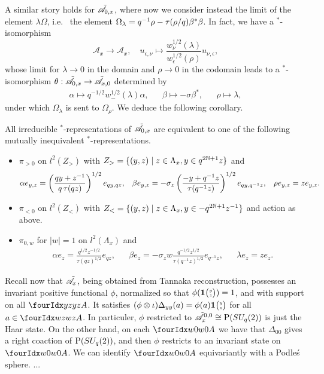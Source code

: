 A similar story holds for $\tilde{\mathscr{A}}_{0,x}$, where now we consider instead the limit of the element $\lambda \Omega$, i.e.~ the element $\Omega_{\lambda} = q^{-1}\rho - \operatorname{\tau}(\rho/q)\beta^*\beta$. In fact, we have a $^*$-isomorphism \[\mathscr{A}_x\rightarrow \mathscr{A}_x, \quad u_{\epsilon,\nu}\mapsto \frac{w_{\nu}^{1/2}(\lambda)}{w_{\epsilon}^{1/2}(\rho)}u_{\nu,\epsilon},\] whose limit for $\lambda\rightarrow 0$ in the domain and $\rho\rightarrow 0$ in the codomain leads to a $^*$-isomorphism $\theta: \tilde{\mathscr{A}}_{0,x}\rightarrow \tilde{\mathscr{A}}_{x,0}$ determined by  \begin{align*} \alpha \mapsto q^{-1/2}w_{-}^{1/2}(\lambda) \alpha,&& \beta \mapsto -\sigma\beta^*,&& \rho \mapsto \lambda,\end{align*} under which $\Omega_{\lambda}$ is sent to $\Omega_{\rho}$. We deduce the following corollary. 

\begin{Cor} All irreducible $^*$-representations of $\tilde{\mathscr{A}}_{0,x}$ are equivalent to one of the following mutually inequivalent $^*$-representations.
\begin{itemize} 
\item $\pi_{>0}$ on $l^2(Z_>)$ with $Z_> = \{(y,z)\mid z\in \Lambda_x,y\in q^{2\mathbb{N}+1}z\}$ and  \begin{align*} \alpha e_{y,z} =  \left(\frac{qy+z^{-1}}{q\operatorname{\tau}(qz)}\right)^{1/2}e_{qy,qz}, && \beta e_{y,z} = - \sigma_{z} \left(\frac{-y+q^{-1}z}{\operatorname{\tau}(q^{-1}z)}\right)^{1/2}e_{qy,q^{-1}z},&& \rho e_{y,z} = ze_{y,z}.\end{align*}
\item $\pi_{<0}$ on $l^2(Z_<)$ with $Z_< = \{(y,z)\mid z\in \Lambda_x,y \in -q^{2\mathbb{N}+1}z^{-1}\}$ and action as above.
\item $\pi_{0,w}$ for $|w| = 1$ on $l^2(\Lambda_x)$ and \begin{align*} \alpha e_z =\frac{q^{1/2}z^{-1/2}}{\tau(qz)^{1/2}} e_{qz},&& \beta e_z =  -\sigma_z w\frac{q^{-1/2}z^{1/2}}{\tau(q^{-1}z)^{1/2}}e_{q^{-1}z},&& \lambda e_{z} = ze_z.\end{align*}
\end{itemize}
\end{Cor} 

Recall now that $\tilde{\mathscr{A}}_x$, being obtained from Tannaka reconstruction, possesses an invariant positive functional $\phi$, normalized so that $\phi(\mathbf{1}{\tiny {\begin{pmatrix} y\\z\end{pmatrix}}})=1$, and with support on all $\Gr{A}{y}{y}{z}{z}$. It satisfies $(\phi\otimes \iota)\Delta_{yy}(a) = \phi(a) \mathbf{1}{\tiny {\begin{pmatrix} y\\z\end{pmatrix}}}$ for all $a\in \Gr{A}{w}{w}{z}{z}$. In particuler, $\phi$ restricted to $\tilde{\mathscr{A}}_x^{0,0}\cong \operatorname{\mathrm{P}}(SU_q(2))$ is just the Haar state. On the other hand, on each $\Gr{A}{w}{w}{0}{0}$ we have that $\Delta_{00}$ gives a right coaction of $\operatorname{\mathrm{P}}(SU_q(2))$, and then $\phi$ restricts to an invariant state on $\Gr{A}{w}{w}{0}{0}$. We can identify $\Gr{A}{w}{w}{0}{0}$ equivariantly with a Podle\'{s} sphere. ...

